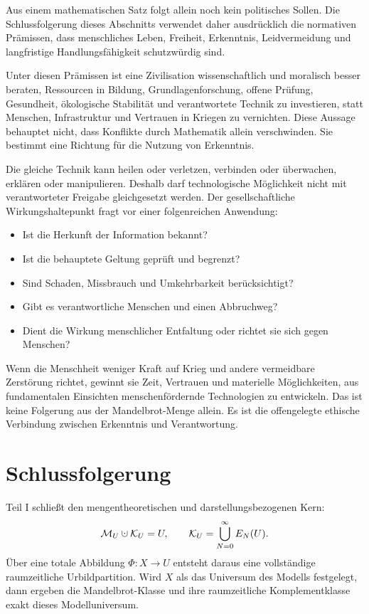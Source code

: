 \documentclass[11pt,a4paper]{article}
\theoremstyle{remark}
\newcommand{\M}{\mathcal{M}}
\newcommand{\K}{\mathcal{K}}
\newcommand{\dotcup}{\mathbin{\mathaccent\cdot\cup}}
\begin{document}
Aus einem mathematischen Satz folgt allein noch kein politisches Sollen. Die
Schlussfolgerung dieses Abschnitts verwendet daher ausdrücklich die
normativen Prämissen, dass menschliches Leben, Freiheit, Erkenntnis,
Leidvermeidung und langfristige Handlungsfähigkeit schutzwürdig sind.

Unter diesen Prämissen ist eine Zivilisation wissenschaftlich und moralisch
besser beraten, Ressourcen in Bildung, Grundlagenforschung, offene Prüfung,
Gesundheit, ökologische Stabilität und verantwortete Technik zu investieren,
statt Menschen, Infrastruktur und Vertrauen in Kriegen zu vernichten. Diese
Aussage behauptet nicht, dass Konflikte durch Mathematik allein verschwinden.
Sie bestimmt eine Richtung für die Nutzung von Erkenntnis.

Die gleiche Technik kann heilen oder verletzen, verbinden oder überwachen,
erklären oder manipulieren. Deshalb darf technologische Möglichkeit nicht mit
verantworteter Freigabe gleichgesetzt werden. Der gesellschaftliche
Wirkungshaltepunkt fragt vor einer folgenreichen Anwendung:

\begin{itemize}
  \item Ist die Herkunft der Information bekannt?
  \item Ist die behauptete Geltung geprüft und begrenzt?
  \item Sind Schaden, Missbrauch und Umkehrbarkeit berücksichtigt?
  \item Gibt es verantwortliche Menschen und einen Abbruchweg?
  \item Dient die Wirkung menschlicher Entfaltung oder richtet sie sich gegen
  Menschen?
\end{itemize}

Wenn die Menschheit weniger Kraft auf Krieg und andere vermeidbare
Zerstörung richtet, gewinnt sie Zeit, Vertrauen und materielle Möglichkeiten,
aus fundamentalen Einsichten menschenfördernde Technologien zu entwickeln.
Das ist keine Folgerung aus der Mandelbrot-Menge allein. Es ist die
offengelegte ethische Verbindung zwischen Erkenntnis und Verantwortung.

\section{Schlussfolgerung}

Teil I schließt den mengentheoretischen und darstellungsbezogenen Kern:
\[
  \M_U\dotcup\K_U=U,
  \qquad
  \K_U=\bigcup_{N=0}^{\infty}E_N(U).
\]
Über eine totale Abbildung \(\Phi:X\to U\) entsteht daraus eine vollständige
raumzeitliche Urbildpartition. Wird \(X\) als das Universum des Modells
festgelegt, dann ergeben die Mandelbrot-Klasse und ihre raumzeitliche
Komplementklasse exakt dieses Modelluniversum.
\end{document}

